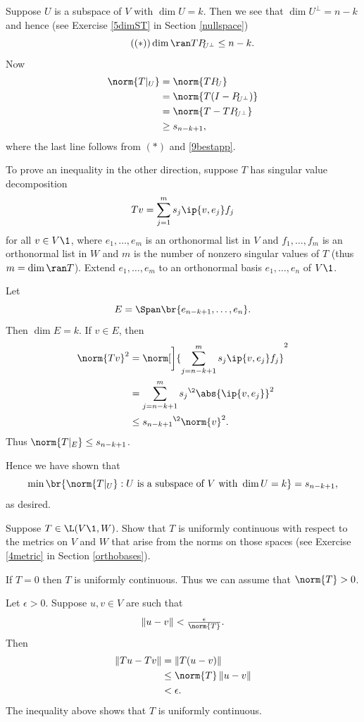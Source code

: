 \begin{Solution}
Suppose $U$ is a subspace of $V$ with $\dim U = k$. Then we see that
$\dim U^\perp = n-k$ and hence (see Exercise \ref{5dimST} in Section \ref{nullspace})
\[ \tag{$(*)$}
\dim \ran TP_{\!U^\perp} \le n-k.
\]
Now
\begin{align*}
\norm{T|_U } &=\norm{TP_{\!U}} \\
&= \norm{ T (I - P_{\!U^\perp})}\\
&= \norm{ T - TP_{\!U^\perp} }\\
&\ge s_{n-k+1},
\end{align*}
where the last line follows from $(*)$ and  \ref{9bestapp}.

To prove an inequality in the other direction, suppose $T$ has singular value decomposition
\[
Tv = \sum_{j=1}^m s_j \ip{v, e_j} f_j
\]
for all $v \in V\1$, where $e_1, \ldots, e_m$ is an orthonormal list in $V$ and $f_1, \ldots, f_m$ is an orthonormal list in $W$ and $m$ is the number of nonzero singular values of $T$ (thus $m = \dim \ran T$). Extend $e_1, \ldots, e_m$ to an orthonormal basis $e_1, \ldots, e_n$ of $V\1$.

Let
\[
E = \Span \br{e_{n-k+1}, \ldots, e_n}.
\]
Then $\dim E = k$. If $v \in E$, then
\begin{align*}
\norm{Tv}^2 &= \norm[\bigg]{ \sum_{j=n-k+1}^m s_j \ip{v, e_j} f_j}^2 \\[1bp]
&= \sum_{j=n-k+1}^m {s_j}^{\2} \abs{\ip{v, e_j}}^2 \\[1bp]
&\le {s_{n-k+1}}^{\2} \norm{v}^2.
\end{align*}
Thus $\norm{T|_E} \le s_{n-k+1}$.

Hence we have shown that
\[
\min \br{ \norm{T|_U} : U \text { is a subspace of } V \text{ with } \dim U = k} = s_{n-k+1},
\]
as desired.
\end{Solution}

\exercise
Suppose $T \in \L(V\1, W)$. Show that $T$ is uniformly continuous with respect to the metrics on $V$ and $W$ that arise from the norms on those spaces (see Exercise \ref{4metric} in Section \ref{orthobases}).

\begin{Solution}
If $T = 0$ then $T$ is uniformly continuous. Thus we can assume that $\norm{T} > 0$.

Let $\epsilon > 0$. Suppose $u, v \in V$ are such that
\[
\|u - v \| < \tfrac{\epsilon}{\norm{T}}.
\]
Then
\begin{align*}
\|Tu - Tv\| &= \|T(u - v) \| \\
&\le \norm{T} \, \|u- v\| \\
&<  \epsilon.
\end{align*}
The inequality above shows that $T$ is uniformly continuous.
\end{Solution}

